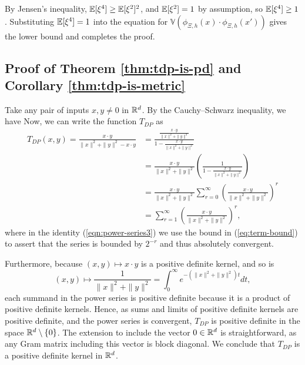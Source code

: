 By Jensen's inequality, $\mathbb{E}[\xi^4]\geq \mathbb{E}[\xi^2]^2$, and $\mathbb{E}[\xi^2]=1$ by assumption, so $\mathbb{E}[\xi^4]\geq1$.
    Substituting $\mathbb{E}[\xi^4]=1$ into the equation for $\mathbb{V}(\phi_{\Xi,h}(x)\cdot \phi_{\Xi,h}(x'))$ gives the lower bound and completes the proof.

\subsection{Proof of Theorem \ref{thm:tdp-is-pd} and Corollary \ref{thm:tdp-is-metric}}\label{apdx:tdp-is-pd-proof}

Take any pair of inputs $x,y\neq 0$ in $\mathbb{R}^d$. By the Cauchy--Schwarz inequality, we have
Now, we can write the function $T_{DP}$ as
\begin{align}
    T_{DP}(x,y) = \frac{x\cdot y}{\|x\|^2 + \|y\|^2 - x\cdot y} &= \frac{\frac{x\cdot y}{\|x\|^2 + \|y\|^2}}{1 - \frac{x\cdot y}{\|x\|^2 + \|y\|^2}} \label{eqn:power-series1} \\
    &= \frac{x\cdot y}{\|x\|^2 + \|y\|^2}\left(\frac{1}{1 - \frac{x\cdot y}{\|x\|^2 + \|y\|^2}}\right) \label{eqn:power-series2} \\
    &= \frac{x\cdot y}{\|x\|^2 + \|y\|^2} \sum_{r=0}^\infty \left(\frac{x\cdot y}{\|x\|^2 + \|y\|^2}\right)^r \label{eqn:power-series3} \\
    &= \sum_{r=1}^\infty \left(\frac{x\cdot y}{\|x\|^2 + \|y\|^2}\right)^r \label{eqn:power-series},
\end{align}
where in the identity (\ref{eqn:power-series3}) we use the bound in (\ref{eq:term-bound}) to assert that the series is bounded by $2^{-r}$ and thus absolutely convergent.

Furthermore, because $(x,y)\mapsto x\cdot y$ is a positive definite kernel, and so is
$$(x,y)\mapsto \frac{1}{\|x\|^2+\|y\|^2 } = \int_{0}^\infty  e^{-(\|x\|^2+\|y\|^2)t}  dt,$$
each summand in the power series is positive definite because it is a product of positive definite kernels.
Hence, as sums and limits of positive definite kernels are positive definite, and the power series is convergent, $T_{DP}$ is positive definite in the space $\mathbb{R}^d\setminus \{0\}$. The extension to include the vector $0\in\mathbb{R}^d$ is straightforward, as any Gram matrix including this vector is block diagonal. We conclude that $T_{DP}$ is a positive definite kernel in $\mathbb{R}^d$. 

